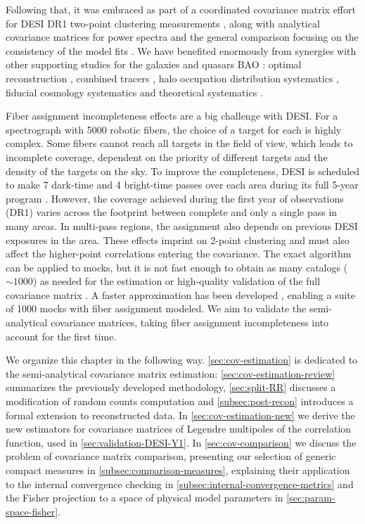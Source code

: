 Following that, it was embraced as part of a coordinated covariance matrix effort for DESI DR1 two-point clustering measurements \citep{DESI2024.II.KP3}, along with analytical covariance matrices for power spectra \citep{KP4s8-Alves} and the general comparison focusing on the consistency of the model fits \citep{KP4s6-Forero-Sanchez}.
We have benefited enormously from synergies with other supporting studies for the galaxies and quasars BAO \citep{DESI2024.III.KP4}:
optimal reconstruction \citep{KP4s3-Chen,KP4s4-Paillas},
combined tracers \citep{KP4s5-Valcin},
halo occupation distribution systematics \citep{KP4s10-Mena-Fernandez,KP4s11-Garcia-Quintero},
fiducial cosmology systematics \citep{KP4s9-Perez-Fernandez}
and
theoretical systematics \citep{KP4s2-Chen}.

Fiber assignment incompleteness effects are a big challenge with DESI.
For a spectrograph with 5000 robotic fibers, the choice of a target for each is highly complex.
Some fibers cannot reach all targets in the field of view, which leads to incomplete coverage, dependent on the priority of different targets and the density of the targets on the sky.
To improve the completeness, DESI is scheduled to make 7 dark-time and 4 bright-time passes over each area during its full 5-year program \citep{SurveyOps.Schlafly.2023}.
However, the coverage achieved during the first year of observations (DR1) varies across the footprint \citep{KP3s15-Ross} between complete and only a single pass in many areas.
In multi-pass regions, the assignment also depends on previous DESI exposures in the area.
These effects imprint on 2-point clustering \citep{KP3s6-Bianchi} and must also affect the higher-point correlations entering the covariance.
The exact algorithm can be applied to mocks, but it is not fast enough to obtain as many catalogs ($\sim 1000$) as needed for the estimation or high-quality validation of the full covariance matrix \citep{KP3s7-Lasker}.
A faster approximation has been developed \citep{KP3s11-Sikandar}, enabling a suite of 1000 mocks with fiber assignment modeled.
We aim to validate the semi-analytical covariance matrices, taking fiber assignment incompleteness into account for the first time.

We organize this chapter in the following way.
\cref{sec:cov-estimation} is dedicated to the semi-analytical covariance matrix estimation: \cref{sec:cov-estimation-review} summarizes the previously developed methodology, \cref{sec:split-RR} discusses a modification of random counts computation and \cref{subsec:post-recon} introduces a formal extension to reconstructed data.
In \cref{sec:cov-estimation-new} we derive the new estimators for covariance matrices of Legendre multipoles of the correlation function, used in \cref{sec:validation-DESI-Y1}.
In \cref{sec:cov-comparison} we discuss the problem of covariance matrix comparison, presenting our selection of generic compact measures in \cref{subsec:comparison-measures}, explaining their application to the internal convergence checking in \cref{subsec:internal-convergence-metrics} and the Fisher projection to a space of physical model parameters in \cref{sec:param-space-fisher}.

